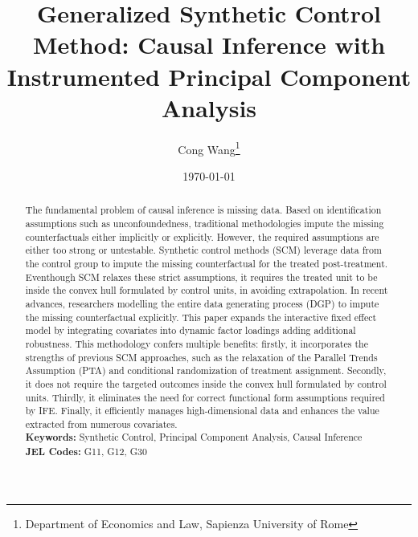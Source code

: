 \documentclass[12pt]{article}
\begin{document}
\newtheorem{assumption}{Assumption}

\begin{titlepage}
\title{Generalized Synthetic Control Method: Causal Inference with Instrumented Principal Component Analysis}
\author{ Cong Wang\thanks{Department of Economics and Law, Sapienza University of Rome}}
\date{\today}
\maketitle
\begin{abstract}
\noindent The fundamental problem of causal inference is missing data. Based on identification assumptions such as unconfoundedness, traditional methodologies impute the missing counterfactuals either implicitly or explicitly. However, the required assumptions are either too strong or untestable. Synthetic control methods (SCM) leverage data from the control group to impute the missing counterfactual for the treated post-treatment. Eventhough SCM relaxes these strict assumptions, it requires the treated unit to be inside the convex hull formulated by control units, in avoiding extrapolation. In recent advances, researchers modelling the entire data generating process (DGP) to impute the missing counterfactual explicitly. This paper expands the interactive fixed effect model by integrating covariates into dynamic factor loadings adding additional robustness. This methodology confers multiple benefits: firstly, it incorporates the strengths of previous SCM approaches, such as the relaxation of the Parallel Trends Assumption (PTA) and conditional randomization of treatment assignment. Secondly, it does not require the targeted outcomes inside the convex hull formulated by control units. Thirdly, it eliminates the need for correct functional form assumptions required by IFE. Finally, it efficiently manages high-dimensional data and enhances the value extracted from numerous covariates.\\

\noindent\textbf{Keywords:} Synthetic Control, Principal Component Analysis, Causal Inference\\

\noindent\textbf{JEL Codes:} G11, G12, G30\\
\bigskip
\end{abstract}
\setcounter{page}{0}
\thispagestyle{empty}
\end{titlepage}
\pagebreak \newpage
\end{document}
